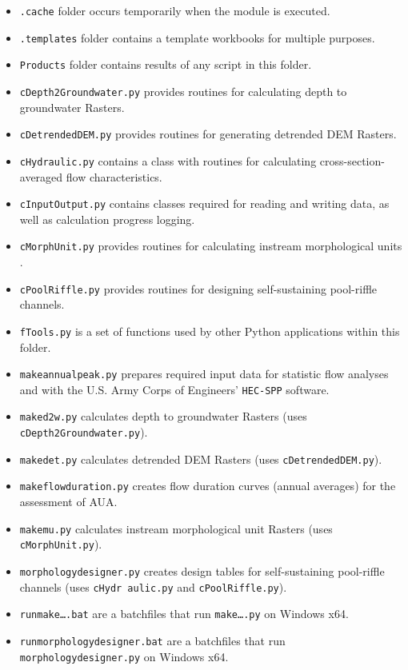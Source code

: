 \begin{itemize}
\begin{itemize}
		\item \texttt{.cache} folder occurs temporarily when the module is executed.
		\item \texttt{.templates} folder contains a template workbooks for multiple purposes.
		\item \texttt{Products} folder contains results of any script in this folder.
		\item \texttt{cDepth2Groundwater.py} provides routines for calculating depth to groundwater Rasters.
		\item \texttt{cDetrendedDEM.py} provides routines for generating detrended DEM Rasters.
		\item \texttt{cHydraulic.py} contains a  class with routines for calculating cross-section-averaged flow characteristics.
		\item \texttt{cInputOutput.py} contains classes required for reading and writing data, as well as calculation progress logging.
		\item \texttt{cMorphUnit.py} provides routines for calculating instream morphological units \citep{wyrick14b}.
		\item \texttt{cPoolRiffle.py} provides routines for designing self-sustaining pool-riffle channels.
		\item \texttt{fTools.py} is a set of functions used by other Python applications within this folder.		
		\item \texttt{make{\myUnderscore}annual{\myUnderscore}peak.py} prepares required input data for statistic flow analyses and with the U.S. Army Corps of Engineers' \texttt{HEC-SPP} software.
		\item \texttt{make{\myUnderscore}d2w.py} calculates depth to groundwater Rasters (uses \texttt{cDepth2Groundwater.py}).
		\item \texttt{make{\myUnderscore}det.py} calculates detrended DEM Rasters (uses \texttt{cDetrendedDEM.py}).
		\item \texttt{make{\myUnderscore}flow{\myUnderscore}duration.py} creates flow duration curves (annual averages) for the assessment of AUA.
		\item \texttt{make{\myUnderscore}mu.py} calculates instream morphological unit Rasters (uses \texttt{cMorphUnit.py}).
		\item \texttt{morphology{\myUnderscore}designer.py} creates design tables for self-sustaining pool-riffle channels (uses \texttt{cHydr aulic.py} and \texttt{cPoolRiffle.py}).
		\item \texttt{run{\myUnderscore}make{\myUnderscore}\ldots{}.bat} are a batchfiles that run \texttt{make{\myUnderscore}\ldots{}.py} on Windows x64.
		\item \texttt{run{\myUnderscore}morphology{\myUnderscore}designer.bat} are a batchfiles that run \texttt{morphology{\myUnderscore}designer.py} on Windows x64.
	\end{itemize}
\end{itemize}


